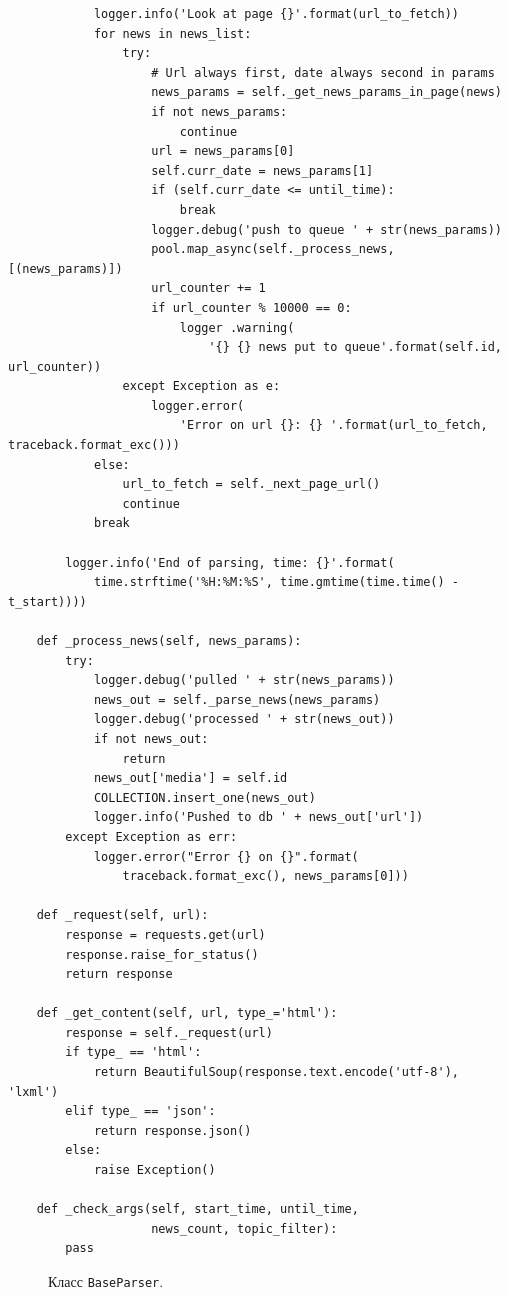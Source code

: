 \documentclass[a4paper, 14pt]{extarticle}
\begin{document}
\begin{verbatim}
            logger.info('Look at page {}'.format(url_to_fetch))
            for news in news_list:
                try:
                    # Url always first, date always second in params
                    news_params = self._get_news_params_in_page(news)
                    if not news_params:
                        continue
                    url = news_params[0]
                    self.curr_date = news_params[1]
                    if (self.curr_date <= until_time):
                        break
                    logger.debug('push to queue ' + str(news_params))
                    pool.map_async(self._process_news, [(news_params)])
                    url_counter += 1
                    if url_counter % 10000 == 0:
                        logger .warning(
                            '{} {} news put to queue'.format(self.id, url_counter))
                except Exception as e:
                    logger.error(
                        'Error on url {}: {} '.format(url_to_fetch, traceback.format_exc()))
            else:
                url_to_fetch = self._next_page_url()
                continue
            break

        logger.info('End of parsing, time: {}'.format(
            time.strftime('%H:%M:%S', time.gmtime(time.time() - t_start))))

    def _process_news(self, news_params):
        try:
            logger.debug('pulled ' + str(news_params))
            news_out = self._parse_news(news_params)
            logger.debug('processed ' + str(news_out))
            if not news_out:
                return
            news_out['media'] = self.id
            COLLECTION.insert_one(news_out)
            logger.info('Pushed to db ' + news_out['url'])
        except Exception as err:
            logger.error("Error {} on {}".format(
                traceback.format_exc(), news_params[0]))

    def _request(self, url):
        response = requests.get(url)
        response.raise_for_status()
        return response

    def _get_content(self, url, type_='html'):
        response = self._request(url)
        if type_ == 'html':
            return BeautifulSoup(response.text.encode('utf-8'), 'lxml')
        elif type_ == 'json':
            return response.json()
        else:
            raise Exception()

    def _check_args(self, start_time, until_time,
                    news_count, topic_filter):
        pass
\end{verbatim}
\vspace{-1cm}
\begin{figure}[H]
	\caption{Класс \texttt{BaseParser}.}
	\label{base}
\end{figure}
\end{document}
